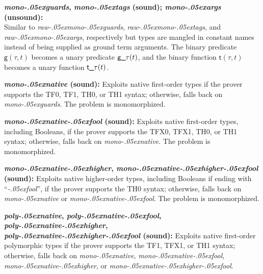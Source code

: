\documentclass[a4paper,12pt]{article}
\newcommand\const[1]{\textsf{#1}}
\renewcommand\_{\hbox{\textunderscore\kern-.05ex}}
\begin{document}
\begin{enum}
\begin{enum}
\item[\labelitemi]
\textbf{%
\textit{mono\_guards}, \textit{mono\_tags} (sound);
\textit{mono\_args} \\ (unsound):} \\
Similar to
\textit{raw\_mono\_guards}, \textit{raw\_mono\_tags}, and
\textit{raw\_mono\_\allowbreak args}, respectively but types are mangled in constant names
instead of being supplied as ground term arguments. The binary predicate
$\const{g}(\tau, t)$ becomes a unary predicate
$\const{g\_}\tau(t)$, and the binary function
$\const{t}(\tau, t)$ becomes a unary function
$\const{t\_}\tau(t)$.

\item[\labelitemi] \textbf{\textit{mono\_native} (sound):} Exploits native
first-order types if the prover supports the TF0, TF1, TH0, or TH1 syntax;
otherwise, falls back on \textit{mono\_guards}. The problem is monomorphized.

\item[\labelitemi] \textbf{\textit{mono\_native\_fool} (sound):} Exploits native
first-order types, including Booleans, if the prover supports the TFX0, TFX1,
TH0, or TH1 syntax; otherwise, falls back on \textit{mono\_native}. The problem
is monomorphized.

\item[\labelitemi] \textbf{\textit{mono\_native\_higher},
\textit{mono\_native\_higher\_fool} \\ (sound):} Exploits native higher-order
types, including Booleans if ending with ``\textit{\_fool}'', if the prover
supports the TH0 syntax; otherwise, falls back on \textit{mono\_native} or
\textit{mono\_native\_fool}. The problem is monomorphized.

\item[\labelitemi] \textbf{\textit{poly\_native}, \textit{poly\_native\_fool},
\textit{poly\_native\_higher}, \\ \textit{poly\_native\_higher\_fool} (sound):}
Exploits native first-order polymorphic types if the prover supports the TF1,
TFX1, or TH1 syntax; otherwise, falls back on \textit{mono\_native},
\textit{mono\_native\_fool}, \textit{mono\_native\_higher}, or
\textit{mono\_native\_higher\_fool}.


\end{enum}
\end{enum}
\end{document}

